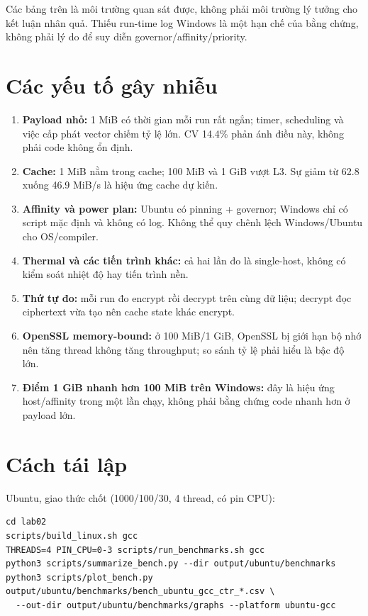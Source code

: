 \documentclass[12pt,a4paper,oneside]{report}
\begin{document}
Các bảng trên là môi trường quan sát được, không phải môi trường lý tưởng cho kết luận nhân quả. Thiếu run-time log Windows là một hạn chế của bằng chứng, không phải lý do để suy diễn governor/affinity/priority.


\section{Các yếu tố gây nhiễu}


\begin{enumerate}[leftmargin=*]
\item \textbf{Payload nhỏ:} 1 MiB có thời gian mỗi run rất ngắn; timer, scheduling và việc cấp phát vector chiếm tỷ lệ lớn. CV 14.4\% phản ánh điều này, không phải code không ổn định.
\item \textbf{Cache:} 1 MiB nằm trong cache; 100 MiB và 1 GiB vượt L3. Sự giảm từ 62.8 xuống 46.9 MiB/s là hiệu ứng cache dự kiến.
\item \textbf{Affinity và power plan:} Ubuntu có pinning + governor; Windows chỉ có script mặc định và không có log. Không thể quy chênh lệch Windows/Ubuntu cho OS/compiler.
\item \textbf{Thermal và các tiến trình khác:} cả hai lần đo là single-host, không có kiểm soát nhiệt độ hay tiến trình nền.
\item \textbf{Thứ tự đo:} mỗi run đo encrypt rồi decrypt trên cùng dữ liệu; decrypt đọc ciphertext vừa tạo nên cache state khác encrypt.
\item \textbf{OpenSSL memory-bound:} ở 100 MiB/1 GiB, OpenSSL bị giới hạn bộ nhớ nên tăng thread không tăng throughput; so sánh tỷ lệ phải hiểu là bậc độ lớn.
\item \textbf{Điểm 1 GiB nhanh hơn 100 MiB trên Windows:} đây là hiệu ứng host/affinity trong một lần chạy, không phải bằng chứng code nhanh hơn ở payload lớn.
\end{enumerate}


\section{Cách tái lập}


Ubuntu, giao thức chốt (1000/100/30, 4 thread, có pin CPU):


\begin{Verbatim}
cd lab02
scripts/build_linux.sh gcc
THREADS=4 PIN_CPU=0-3 scripts/run_benchmarks.sh gcc
python3 scripts/summarize_bench.py --dir output/ubuntu/benchmarks
python3 scripts/plot_bench.py output/ubuntu/benchmarks/bench_ubuntu_gcc_ctr_*.csv \
  --out-dir output/ubuntu/benchmarks/graphs --platform ubuntu-gcc
\end{Verbatim}
\end{document}
